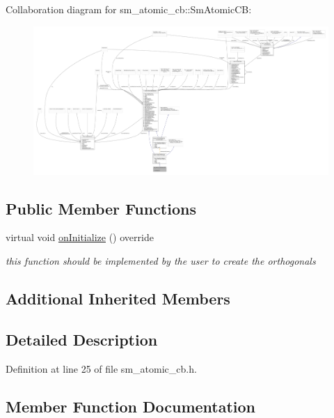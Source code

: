 Collaboration diagram for sm\+\_\+atomic\+\_\+cb\+:\+:Sm\+Atomic\+CB\+:
\nopagebreak
\begin{figure}[H]
\begin{center}
\leavevmode
\includegraphics[width=350pt]{structsm__atomic__cb_1_1SmAtomicCB__coll__graph}
\end{center}
\end{figure}
\subsection*{Public Member Functions}
\begin{DoxyCompactItemize}
\item 
virtual void \hyperlink{structsm__atomic__cb_1_1SmAtomicCB_a20752de7461ec516ffe001f2e09673cf}{on\+Initialize} () override
\begin{DoxyCompactList}\small\item\em this function should be implemented by the user to create the orthogonals \end{DoxyCompactList}\end{DoxyCompactItemize}
\subsection*{Additional Inherited Members}


\subsection{Detailed Description}


Definition at line 25 of file sm\+\_\+atomic\+\_\+cb.\+h.



\subsection{Member Function Documentation}
\mbox{\label{structsm__atomic__cb_1_1SmAtomicCB_a20752de7461ec516ffe001f2e09673cf}} 
